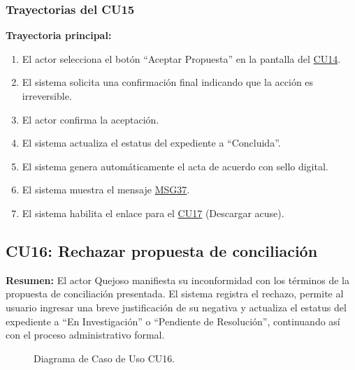 \begin{appendices}
\subsubsection{Trayectorias del CU15}
\textbf{Trayectoria principal:}
\begin{enumerate}[nosep]
    \item El actor selecciona el botón ``Aceptar Propuesta'' en la pantalla del \hyperlink{anexo:casos_uso}{CU14}.
    \item El sistema solicita una confirmación final indicando que la acción es irreversible.
    \item El actor confirma la aceptación.
    \item El sistema actualiza el estatus del expediente a ``Concluida''.
    \item El sistema genera automáticamente el acta de acuerdo con sello digital.
    \item El sistema muestra el mensaje \hyperlink{msg:MSG37}{MSG37}.
    \item El sistema habilita el enlace para el \hyperlink{anexo:casos_uso}{CU17} (Descargar acuse).
\end{enumerate}

\newpage

\subsection{CU16: Rechazar propuesta de conciliación}

\textbf{Resumen:} 
El actor Quejoso manifiesta su inconformidad con los términos de la propuesta de conciliación presentada. El sistema registra el rechazo, permite al usuario ingresar una breve justificación de su negativa y actualiza el estatus del expediente a ``En Investigación'' o ``Pendiente de Resolución'', continuando así con el proceso administrativo formal.

\begin{figure}[htbp]
    \centering
    \figCUdieciseis
    \caption{Diagrama de Caso de Uso CU16.}
    \label{fig:cu16}
\end{figure}


\end{appendices}
